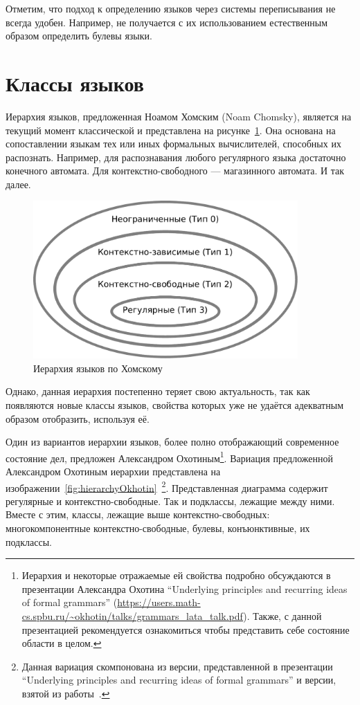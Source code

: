 Отметим, что подход к определению языков через системы переписывания не всегда удобен. Например, не получается с их использованием естественным образом определить булевы языки.


\section{Классы языков}

Иерархия языков, предложенная Ноамом Хомским (Noam Chomsky), является на текущий момент классической и представлена на рисунке~\ref{fig:Chomsky}.
Она основана на сопоставлении языкам тех или иных формальных вычислителей, способных их распознать. 
Например, для распознавания любого регулярного языка достаточно конечного автомата. Для контекстно-свободного --- магазинного автомата. И так далее.


\begin{figure}
  \begin{center}
  \includegraphics[width=0.9\textwidth]{figures/Chomsky.pdf}
  \end{center}
  \caption{Иерархия языков по Хомскому}
  \label{fig:Chomsky}
\end{figure}

Однако, данная иерархия постепенно теряет свою актуальность, так как появляются новые классы языков, свойства которых уже не удаётся адекватным образом отобразить, используя её. 

Один из вариантов иерархии языков, более полно отображающий современное состояние дел, предложен Александром Охотиным\footnote{Иерархия и некоторые отражаемые ей свойства подробно обсуждаются в презентации Александра Охотина ``Underlying principles
and recurring ideas of formal grammars'' (\url{https://users.math-cs.spbu.ru/~okhotin/talks/grammars_lata_talk.pdf}).
Также, с данной презентацией рекомендуется ознакомиться чтобы представить себе состояние области в целом.}.
Вариация предложенной Александром Охотиным иерархии представлена на изображении~\ref{fig:hierarchyOkhotin}~\footnote{Данная вариация скомпонована из версии, представленной в презентации ``Underlying principles
and recurring ideas of formal grammars'' и версии, взятой из работы~\cite{MRYKHIN2023113829}.}.
Представленная диаграмма содержит регулярные и контекстно-свободные.
Так и подклассы, лежащие между ними.
Вместе с этим, классы, лежащие выше контекстно-свободных: многокомпонентные контекстно-свободные, булевы, конъюнктивные, их подклассы.

